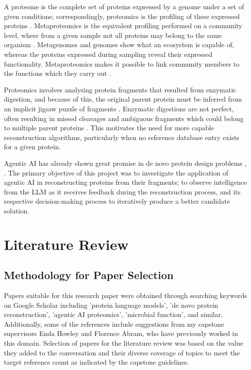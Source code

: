 \documentclass[journal]{IEEEtran}
\begin{document}
A proteome is the complete set of proteins expressed by a genome under a set of given conditions; correspondingly, proteomics is the profiling of these expressed proteins 
\cite{https://doi.org/10.1002/imt2.70031}.
Metaproteomics is the equivalent profiling performed on a community level, where from a given sample not all proteins may belong to the same organism \cite{10.1111/j.1574-6941.2011.01284.x}.
Metagenomes and genomes show what an ecosystem is capable of, whereas the proteins expressed during sampling reveal their expressed functionality.
Metaproteomics makes it possible to link community members to the functions which they carry out \cite{10.1111/j.1574-6941.2011.01284.x}.

Proteomics involves analysing protein fragments that resulted from enzymatic digestion,
and because of this, the original parent protein must be inferred from an implicit jigsaw puzzle of fragments \cite{https://doi.org/10.1002/imt2.70031}.
Enzymatic digestions are not perfect, often resulting in missed cleavages and ambiguous fragments which could belong to multiple
parent proteins \cite{MCDONNELL20232732}. This motivates the need for more capable reconstruction algorithms, particularly when
no reference database entry exists for a given protein.

Agentic AI has already shown great promise in de novo protein design problems \cite{ghafarollahi2024protagentsproteindiscoverylarge}, \cite{ni2025agenticendtoendnovoprotein}. 
The primary objective of this project was to investigate the application of agentic AI 
in reconstructing proteins from their fragments; to observe intelligence from the LLM as it receives feedback during the
reconstruction process, and its respective decision-making process to iteratively produce a better candidate solution.

\section{Literature Review}

\subsection{Methodology for Paper Selection}
Papers suitable for this research paper were obtained through searching keywords on Google Scholar including
'protein language models', 'de novo protein reconstruction', 'agentic AI proteomics', 'microbial function', and similar.
Additionally, some of the references include suggestions from my capstone supervisors Enda Howley and Florence Abram,
who have previously worked in this domain.
Selection of papers for the literature review was based on the value they added to the conversation and their diverse
coverage of topics to meet the target reference count as indicated by the capstone guidelines.
\end{document}
